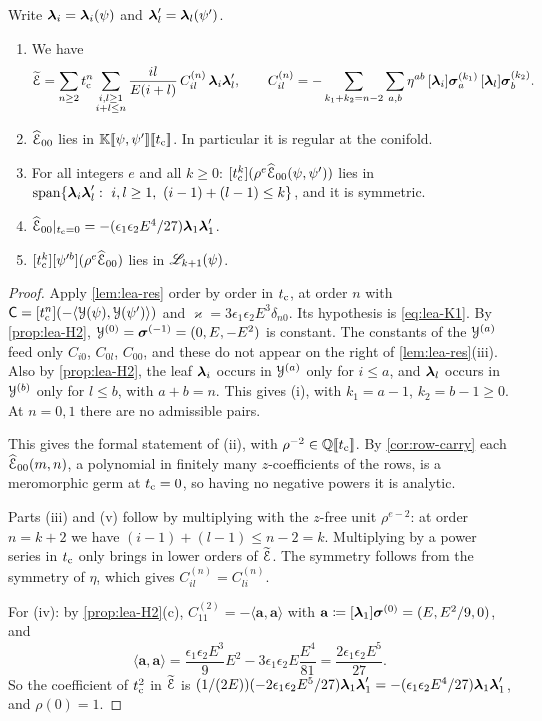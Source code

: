 \begin{thm}\label{thm:lea-E00}
Write $\boldsymbol{\lambda}_i=\boldsymbol{\lambda}_i(\psi)$ and $\boldsymbol{\lambda}_l'=\boldsymbol{\lambda}_l(\psi')$.
\begin{enumerate}
\item[(i)] We have
\[
\widetilde{\mathcal{E}}=\sum_{n\ge2}t_{\mathrm{c}}^n\sum_{\substack{i,l\ge1\\ i+l\le n}}\frac{il}{E(i+l)}\,C^{(n)}_{il}\,\boldsymbol{\lambda}_i\boldsymbol{\lambda}_l',\qquad C^{(n)}_{il}=-\sum_{k_1+k_2=n-2}\sum_{a,b}\eta^{ab}\,[\boldsymbol{\lambda}_i]\boldsymbol{\sigma}_a^{(k_1)}\,[\boldsymbol{\lambda}_l]\boldsymbol{\sigma}_b^{(k_2)}.
\]
\item[(ii)] $\widehat{\mathcal{E}}_{00}$ lies in $\mathbb{K}[\![ \psi,\psi' ]\!][\![ t_{\mathrm{c}} ]\!]$. In particular it is regular at the conifold.
\item[(iii)] For all integers $e$ and all $k\ge0$: $[t_{\mathrm{c}}^k](\rho^e\widehat{\mathcal{E}}_{00}(\psi,\psi'))$ lies in $\mathrm{span}\{\lf_i\lf_l':\ i,l\ge1,\ (i-1)+(l-1)\le k\}$, and it is symmetric.
\item[(iv)] $\widehat{\mathcal{E}}_{00}|_{t_{\mathrm{c}}=0}=-(\epsilon_1\epsilon_2E^4/27)\boldsymbol{\lambda}_1\boldsymbol{\lambda}_1'$.
\item[(v)] $[t_{\mathrm{c}}^k][\psi'^b](\rho^e\widehat{\mathcal{E}}_{00})$ lies in $\mathscr{L}_{k+1}(\psi)$.
\end{enumerate}
\end{thm}

\begin{proof}
Apply \cref{lem:lea-res} order by order in $t_{\mathrm{c}}$, at order $n$ with $\mathsf{C}=[t_{\mathrm{c}}^n](-\langle\mathcal{Y}(\psi),\mathcal{Y}(\psi')\rangle)$ and $\varkappa=3\epsilon_1\epsilon_2E^3\delta_{n0}$. Its hypothesis is \cref{eq:lea-K1}. By \cref{prop:lea-H2}, $\mathcal{Y}^{(0)}=\boldsymbol{\sigma}^{(-1)}=(0,E,-E^2)$ is constant. The constants of the $\mathcal{Y}^{(a)}$ feed only $C_{i0}$, $C_{0l}$, $C_{00}$, and these do not appear on the right of \cref{lem:lea-res}(iii). Also by \cref{prop:lea-H2}, the leaf $\boldsymbol{\lambda}_i$ occurs in $\mathcal{Y}^{(a)}$ only for $i\le a$, and $\boldsymbol{\lambda}_l$ occurs in $\mathcal{Y}^{(b)}$ only for $l\le b$, with $a+b=n$. This gives (i), with $k_1=a-1$, $k_2=b-1\ge0$. At $n=0,1$ there are no admissible pairs.

This gives the formal statement of (ii), with $\rho^{-2}\in\mathbb{Q}[\![ t_{\mathrm{c}} ]\!]$. By \cref{cor:row-carry} each $\widehat{\mathcal{E}}_{00}(m,n)$, a polynomial in finitely many $z$-coefficients of the rows, is a meromorphic germ at $t_{\mathrm{c}}=0$, so having no negative powers it is analytic.

Parts (iii) and (v) follow by multiplying with the $z$-free unit $\rho^{e-2}$: at order $n=k+2$ we have $(i-1)+(l-1)\le n-2=k$. Multiplying by a power series in $t_{\mathrm{c}}$ only brings in lower orders of $\widetilde{\mathcal{E}}$. The symmetry follows from the symmetry of $\eta$, which gives $C^{(n)}_{il}=C^{(n)}_{li}$.

For (iv): by \cref{prop:lea-H2}(c), $C^{(2)}_{11}=-\langle\mathbf{a},\mathbf{a}\rangle$ with $\mathbf{a}\coloneqq[\boldsymbol{\lambda}_1]\boldsymbol{\sigma}^{(0)}=(E,E^2/9,0)$, and
\[
\langle\mathbf{a},\mathbf{a}\rangle=\frac{\epsilon_1\epsilon_2E^3}{9}E^2-3\epsilon_1\epsilon_2E\frac{E^4}{81}=\frac{2\epsilon_1\epsilon_2E^5}{27}.
\]
So the coefficient of $t_{\mathrm{c}}^2$ in $\widetilde{\mathcal{E}}$ is $(1/(2E))(-2\epsilon_1\epsilon_2E^5/27)\boldsymbol{\lambda}_1\boldsymbol{\lambda}_1'=-(\epsilon_1\epsilon_2E^4/27)\boldsymbol{\lambda}_1\boldsymbol{\lambda}_1'$, and $\rho(0)=1$.
\end{proof}

